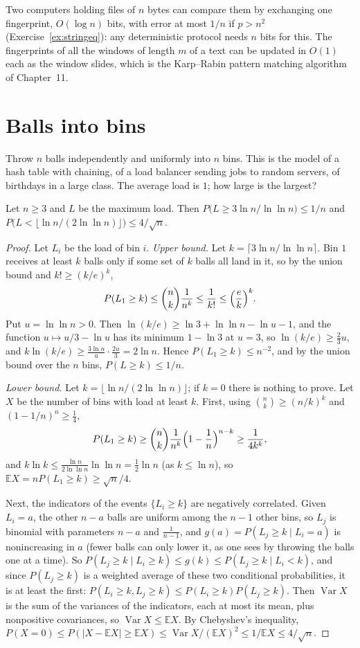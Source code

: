Two computers holding files of $n$ bytes can compare them by exchanging one fingerprint, $O(\log n)$ bits, with error at most $1/n$ if $p>n^2$ (Exercise~\ref{ex:stringeq}): any deterministic protocol needs $n$ bits for this. The fingerprints of all the windows of length $m$ of a text can be updated in
$O(1)$ each as the window slides, which is the Karp--Rabin pattern matching algorithm of Chapter~11.

\section{Balls into bins}\label{sec:bins}

Throw $n$ balls independently and uniformly into $n$ bins. This is the model of a hash table with chaining, of a load balancer sending jobs to random servers, of birthdays in a large class. The average load is $1$; how large is the largest?

\begin{theorem}\label{thm:maxload}
Let $n\ge3$ and $L$ be the maximum load. Then $P\bigl(L\ge3\ln n/\ln\ln n\bigr)\le1/n$ and $P\bigl(L<\lfloor\ln n/(2\ln\ln n)\rfloor\bigr)\le4/\sqrt n$.
\end{theorem}
\begin{proof}
Let $L_i$ be the load of bin $i$. \emph{Upper bound.} Let $k=\lceil3\ln n/\ln\ln n\rceil$. Bin $1$ receives at least $k$ balls only if some set of $k$ balls all land in it, so by the union bound and $k!\ge(k/e)^k$,
\[
P(L_1\ge k)\le\binom nk\frac1{n^k}\le\frac1{k!}\le\Bigl(\frac ek\Bigr)^k.
\]
Put $u=\ln\ln n>0$. Then $\ln(k/e)\ge\ln3+\ln\ln n-\ln u-1$, and the function $u\mapsto u/3-\ln u$ has its minimum $1-\ln3$ at $u=3$, so $\ln(k/e)\ge\tfrac23u$, and $k\ln(k/e)\ge\frac{3\ln n}u\cdot\frac{2u}3=2\ln n$. Hence $P(L_1\ge k)\le n^{-2}$,
and by the union bound over the $n$ bins, $P(L\ge k)\le1/n$.

\emph{Lower bound.} Let $k=\lfloor\ln n/(2\ln\ln n)\rfloor$; if $k=0$ there is nothing to prove. Let $X$ be the number of bins with load at least $k$. First, using $\binom nk\ge(n/k)^k$ and $(1-1/n)^n\ge\frac14$,
\[
P(L_1\ge k)\ge\binom nk\frac1{n^k}\Bigl(1-\frac1n\Bigr)^{n-k}\ge\frac1{4k^k},
\]
and $k\ln k\le\frac{\ln n}{2\ln\ln n}\ln\ln n=\frac12\ln n$ (as $k\le\ln n$), so $\mathbb EX=nP(L_1\ge k)\ge\sqrt n/4$.

Next, the indicators of the events $\{L_i\ge k\}$ are negatively correlated. Given $L_i=a$, the other $n-a$ balls are uniform among the $n-1$ other bins, so $L_j$ is binomial with parameters $n-a$ and $\frac1{n-1}$, and $g(a)=P(L_j\ge k\mid L_i=a)$ is
nonincreasing in $a$ (fewer balls can only lower it, as one sees by throwing the balls one at a time). So $P(L_j\ge k\mid L_i\ge k)\le g(k)\le P(L_j\ge k\mid L_i<k)$, and since $P(L_j\ge k)$ is a weighted average of these two conditional probabilities, it is
at least the first: $P(L_i\ge k,L_j\ge k)\le P(L_i\ge k)P(L_j\ge k)$. Then $\operatorname{Var}X$ is the sum of the variances of the indicators, each at most its mean, plus nonpositive covariances, so $\operatorname{Var}X\le\mathbb EX$. By Chebyshev's inequality,
$P(X=0)\le P(|X-\mathbb EX|\ge\mathbb EX)\le\operatorname{Var}X/(\mathbb EX)^2\le1/\mathbb EX\le4/\sqrt n$.
\end{proof}

